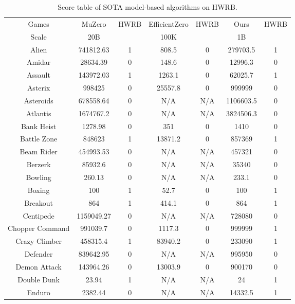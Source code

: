 \begin{table}[!hb]
\footnotesize
\begin{center}
\caption{Score table of  SOTA  model-based algorithms on HWRB.}
\label{Tab:Score table of SOTA  model-based algorithms on HWRB.}
\setlength{\tabcolsep}{1.0pt}
\begin{tabular}{c cc cc cc}
\toprule
Games & MuZero &  HWRB & EfficientZero &  HWRB &Ours  &  HWRB \\ 
        Scale & 20B & ~ & 100K & ~ & 1B & ~ \\ \midrule
        Alien & 741812.63 & 1  & 808.5 & 0  & 279703.5 & 1  \\  
        Amidar & 28634.39 & 0  & 148.6 & 0  & 12996.3 & 0  \\  
        Assault & 143972.03 & 1  & 1263.1 & 0  & 62025.7 & 1  \\  
        Asterix & 998425 & 0  & 25557.8 & 0  & 999999 & 0  \\  
        Asteroids & 678558.64 & 0  & N/A & N/A & 1106603.5 & 0  \\  
        Atlantis & 1674767.2 & 0  & N/A & N/A & 3824506.3 & 0  \\  
        Bank Heist & 1278.98 & 0  & 351 & 0  & 1410 & 0  \\  
        Battle Zone & 848623 & 1  & 13871.2 & 0  & 857369 & 1  \\  
        Beam Rider & 454993.53 & 0  & N/A & N/A & 457321 & 0  \\  
        Berzerk & 85932.6 & 0  & N/A & N/A & 35340 & 0  \\  
        Bowling & 260.13 & 0  & N/A & N/A & 233.1 & 0  \\  
        Boxing & 100 & 1  & 52.7 & 0  & 100 & 1  \\  
        Breakout & 864 & 1  & 414.1 & 0  & 864 & 1  \\  
        Centipede & 1159049.27 & 0  & N/A & N/A & 728080 & 0  \\  
        Chopper Command & 991039.7 & 0  & 1117.3 & 0  & 999999 & 1  \\  
        Crazy Climber & 458315.4 & 1  & 83940.2 & 0  & 233090 & 1  \\  
        Defender & 839642.95 & 0  & N/A & N/A & 995950 & 0  \\  
        Demon Attack & 143964.26 & 0  & 13003.9 & 0  & 900170 & 0  \\  
        Double Dunk & 23.94 & 1  & N/A & N/A & 24 & 1  \\  
        Enduro & 2382.44 & 0  & N/A & N/A & 14332.5 & 1  \\  

\end{tabular}
\end{center}
\end{table}
